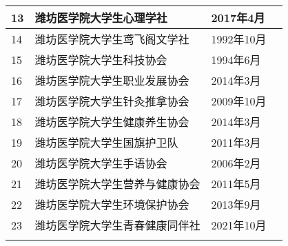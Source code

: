 \begin{table}[H]
\begin{tabular}{|>{\centering\arraybackslash}p{2em}|>{\centering\arraybackslash}p{21em}|%
        >{\centering\arraybackslash}p{6em}|>{\centering\arraybackslash}p{5em}|}
        \cline{1-3}
        13 & 潍坊医学院大学生心理学社          & 2017年4月  &                        \\
        \cline{1-3}
        14 & 潍坊医学院大学生鸢飞阁文学社        & 1992年10月 &                        \\
        \Xhline{1.2pt}
        15 & 潍坊医学院大学生科技协会          & 1994年6月  & \multirow{2}{*}{创新创业类} \\
        \cline{1-3}
        16 & 潍坊医学院大学生职业发展协会        & 2014年3月  &                        \\
        \Xhline{1.2pt}
        17 & 潍坊医学院大学生针灸推拿协会        & 2009年10月 & \multirow{7}{*}{自律互助类} \\
        \cline{1-3}
        18 & 潍坊医学院大学生健康养生协会        & 2014年3月  &                        \\
        \cline{1-3}
        19 & 潍坊医学院大学生国旗护卫队         & 2011年3月  &                        \\
        \cline{1-3}
        20 & 潍坊医学院大学生手语协会          & 2006年2月  &                        \\
        \cline{1-3}
        21 & 潍坊医学院大学生营养与健康协会       & 2011年5月  &                        \\
        \cline{1-3}
        22 & 潍坊医学院大学生环境保护协会        & 2013年9月  &                        \\
        \cline{1-3}
        23 & 潍坊医学院大学生青春健康同伴社       & 2021年10月 &                        \\
        \Xhline{1.2pt}
    \end{tabular}
\end{table}

